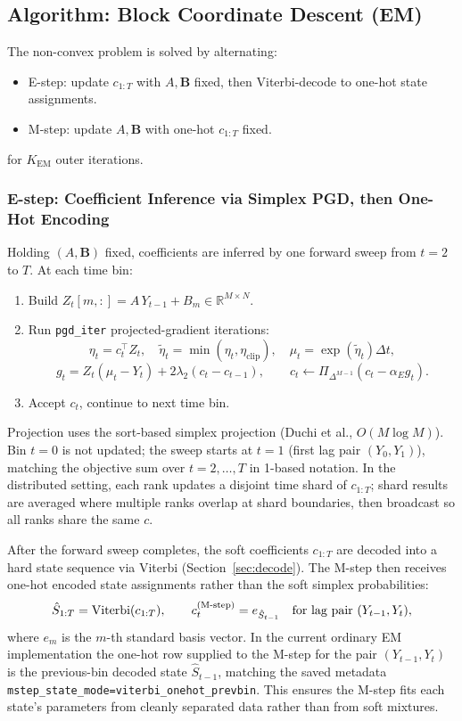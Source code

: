 \documentclass[11pt]{article}
\begin{document}
\subsection{Algorithm: Block Coordinate Descent (EM)}

The non-convex problem is solved by alternating:
\begin{itemize}
  \item E-step: update \(c_{1:T}\) with \(A,\mathbf{B}\) fixed, then Viterbi-decode to one-hot state assignments.
  \item M-step: update \(A,\mathbf{B}\) with one-hot \(c_{1:T}\) fixed.
\end{itemize}
for \(K_{\mathrm{EM}}\) outer iterations.

\subsubsection{E-step: Coefficient Inference via Simplex PGD, then One-Hot Encoding}

Holding \((A,\mathbf{B})\) fixed, coefficients are inferred by one forward
sweep from \(t=2\) to \(T\). At each time bin:
\begin{enumerate}
  \item Build \(Z_t[m,:] = A\,Y_{t-1}+B_m\in\mathbb{R}^{M\times N}\).
  \item Run \texttt{pgd\_iter} projected-gradient iterations:
  \[
    \eta_t = c_t^\top Z_t,\quad
    \tilde{\eta}_t = \min(\eta_t,\eta_{\mathrm{clip}}),\quad
    \mu_t = \exp(\tilde{\eta}_t)\Delta t,
  \]
  \[
    g_t = Z_t\left(\mu_t-Y_t\right) + 2\lambda_2(c_t-c_{t-1}),
    \qquad
    c_t \leftarrow \Pi_{\Delta^{M-1}}(c_t-\alpha_E g_t).
  \]
  \item Accept \(c_t\), continue to next time bin.
\end{enumerate}
Projection uses the sort-based simplex projection (Duchi et al., \(O(M\log M)\)).
Bin \(t=0\) is not updated; the sweep starts at \(t=1\) (first lag pair
\((Y_0,Y_1)\)), matching the objective sum over \(t=2,\dots,T\) in
1-based notation.
In the distributed setting, each rank updates a disjoint time shard of
\(c_{1:T}\); shard results are averaged where multiple ranks overlap at
shard boundaries, then broadcast so all ranks share the same \(c\).

After the forward sweep completes, the soft coefficients \(c_{1:T}\) are decoded into a hard state sequence via Viterbi (Section~\ref{sec:decode}). The M-step then receives one-hot encoded state assignments rather than the soft simplex probabilities:
\begin{equation}
  \hat{S}_{1:T} = \mathrm{Viterbi}(c_{1:T}), \qquad
  c_t^{\mathrm{(M\text{-}step)}} = e_{\hat{S}_{t-1}}
  \quad\hbox{for lag pair }(Y_{t-1},Y_t),
\end{equation}
where \(e_m\) is the \(m\)-th standard basis vector. In the current ordinary
EM implementation the one-hot row supplied to the M-step for the pair
\((Y_{t-1},Y_t)\) is the previous-bin decoded state \(\hat S_{t-1}\), matching
the saved metadata \texttt{mstep\_state\_mode=viterbi\_onehot\_prevbin}.
This ensures the M-step fits each state's parameters from cleanly separated
data rather than from soft mixtures.
\end{document}

